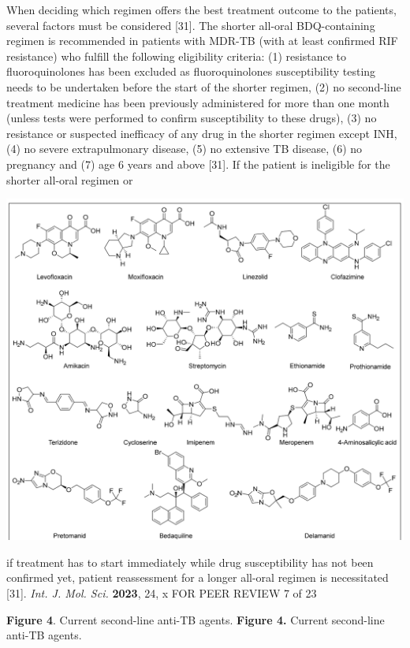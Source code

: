 \documentclass{article}
\begin{document}
When deciding which regimen offers the best treatment outcome to the patients, several factors must be considered [31]. The shorter all-oral BDQ-containing regimen is recommended in patients with MDR-TB (with at least confirmed RIF resistance) who fulfill the following eligibility criteria: (1) resistance to fluoroquinolones has been excluded as fluoroquinolones susceptibility testing needs to be undertaken before the start of the shorter regimen, (2) no second-line treatment medicine has been previously administered for more than one month (unless tests were performed to confirm susceptibility to these drugs), (3) no resistance or suspected inefficacy of any drug in the shorter regimen except INH, (4) no severe extrapulmonary disease, (5) no extensive TB disease, (6) no pregnancy and (7) age 6 years and above [31]. If the patient is ineligible for the shorter all-oral regimen or


\includegraphics{_page_6_Figure_1.png}


if treatment has to start immediately while drug susceptibility has not been confirmed yet, patient reassessment for a longer all-oral regimen is necessitated [31]. \textit{Int. J. Mol. Sci.} \textbf{2023}, 24, x FOR PEER REVIEW 7 of 23

\textbf{Figure 4}. Current second-line anti-TB agents. \textbf{Figure 4.} Current second-line anti-TB agents.
\end{document}
